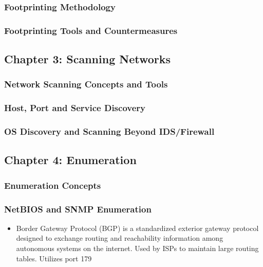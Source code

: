 \subsubsection{Footprinting Methodology}

\subsubsection{Footprinting Tools and Countermeasures}

\subsection{Chapter 3: Scanning Networks}

\subsubsection{Network Scanning Concepts and Tools}

\subsubsection{Host, Port and Service Discovery}

\subsubsection{OS Discovery and Scanning Beyond IDS/Firewall}

\subsection{Chapter 4: Enumeration}

\subsubsection{Enumeration Concepts}

\subsubsection{NetBIOS and SNMP Enumeration}
\begin{itemize}
    \item Border Gateway Protocol (BGP) is a standardized exterior gateway protocol designed to exchange routing and reachability information among autonomous systems on the internet. Used by ISPs to maintain large routing tables. Utilizes port 179
\end{itemize}

